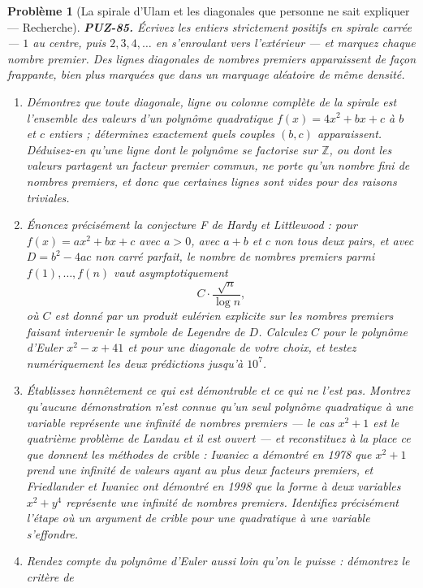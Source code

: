 \documentclass[11pt]{article}
\newtheorem{problem}{Problème}
\begin{document}
\begin{problem}[{La spirale d'Ulam et les diagonales que personne ne sait expliquer --- Recherche}]
\textbf{PUZ-85.} Écrivez les entiers strictement positifs en spirale carrée --- $ 1 $ au
centre, puis $ 2, 3, 4, \dots $ en s'enroulant vers l'extérieur --- et marquez chaque nombre
premier. Des lignes diagonales de nombres premiers apparaissent de façon frappante, bien plus
marquées que dans un marquage aléatoire de même densité.
\begin{enumerate}
\item[(a)] Démontrez que toute diagonale, ligne ou colonne complète de la spirale est l'ensemble des
valeurs d'un polynôme quadratique $ f(x) = 4x^{2} + bx + c $ à $ b $ et $ c $ entiers ;
déterminez exactement quels couples $ (b,c) $ apparaissent. Déduisez-en qu'une ligne dont le
polynôme se factorise sur $ \mathbb{Z} $, ou dont les valeurs partagent un facteur premier
commun, ne porte qu'un nombre fini de nombres premiers, et donc que certaines lignes sont vides
pour des raisons triviales.
\item[(b)] Énoncez précisément la conjecture F de Hardy et Littlewood : pour
$ f(x) = ax^{2}+bx+c $ avec $ a > 0 $, avec $ a+b $ et $ c $ non tous deux pairs, et
avec $ D = b^{2}-4ac $ non carré parfait, le nombre de nombres premiers parmi
$ f(1), \dots, f(n) $ vaut asymptotiquement
\[ C \cdot \frac{\sqrt{n}}{\log n}, \]
où $ C $ est donné par un produit eulérien explicite sur les nombres premiers faisant
intervenir le symbole de Legendre de $ D $. Calculez $ C $ pour le polynôme d'Euler
$ x^{2}-x+41 $ et pour une diagonale de votre choix, et testez numériquement les deux
prédictions jusqu'à $ 10^{7} $.
\item[(c)] Établissez honnêtement ce qui est démontrable et ce qui ne l'est pas. Montrez qu'aucune
démonstration n'est connue qu'un seul polynôme quadratique à une variable représente une
infinité de nombres premiers --- le cas $ x^{2}+1 $ est le quatrième problème de Landau et il
est ouvert --- et reconstituez à la place ce que donnent les méthodes de crible : Iwaniec a
démontré en 1978 que $ x^{2}+1 $ prend une infinité de valeurs ayant au plus deux facteurs
premiers, et Friedlander et Iwaniec ont démontré en 1998 que la forme à deux variables
$ x^{2}+y^{4} $ représente une infinité de nombres premiers. Identifiez précisément l'étape
où un argument de crible pour une quadratique à une variable s'effondre.
\item[(d)] Rendez compte du polynôme d'Euler aussi loin qu'on le puisse : démontrez le critère de

\end{enumerate}
\end{problem}
\end{document}
